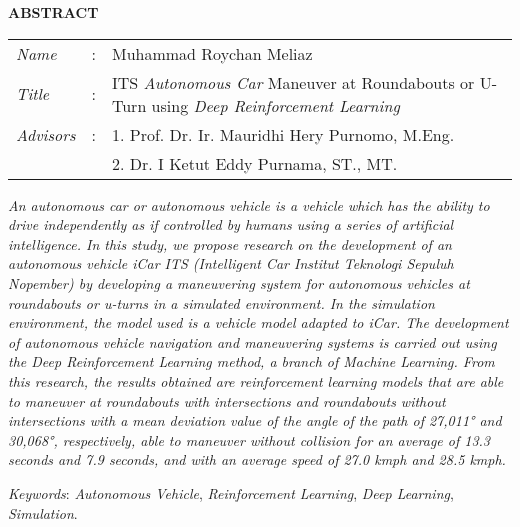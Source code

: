 \begin{center}
  \large\textbf{ABSTRACT}
\end{center}


\vspace{2ex}

\begingroup
  \setlength{\tabcolsep}{0pt}

  \noindent
  \begin{tabularx}{\textwidth}{l >{\centering}m{3em} X}
    \emph{Name}     &:& Muhammad Roychan Meliaz \\

    \emph{Title}    &:& ITS \textit{Autonomous Car} Maneuver at Roundabouts or U-Turn using \textit{Deep Reinforcement Learning} \\

    \emph{Advisors} &:& 1. Prof. Dr. Ir. Mauridhi Hery Purnomo, M.Eng. \\
                    & & 2. Dr. I Ketut Eddy Purnama, ST., MT. \\
  \end{tabularx}
\endgroup

\emph{An autonomous car or autonomous vehicle is a vehicle
	which has the ability to drive independently as if controlled by humans using a series of artificial intelligence. In this study, we propose research on the development of an autonomous vehicle iCar ITS (Intelligent Car Institut Teknologi Sepuluh Nopember) by developing a maneuvering system for autonomous vehicles at roundabouts or u-turns in a simulated environment. In the simulation environment, the model used is a vehicle model adapted to iCar. The development of autonomous vehicle navigation and maneuvering systems is carried out using the Deep Reinforcement Learning method, a branch of Machine Learning. From this research, the results obtained are reinforcement learning models that are able to maneuver at roundabouts with intersections and roundabouts without intersections with a mean deviation value of the angle of the path of 27,011° and 30,068°, respectively, able to maneuver without collision for an average of 13.3 seconds and 7.9 seconds, and with an average speed of 27.0 kmph and 28.5 kmph.}
	
	\iffalse
	it is hoped that reinforcement learning algorithms on autonomous cars can be produced that are able to maneuver at roundabouts or u-turns efficiently.
	\fi

\emph{Keywords}: \emph{Autonomous Vehicle}, \emph{Reinforcement Learning}, \emph{Deep Learning}, \emph{Simulation}.
